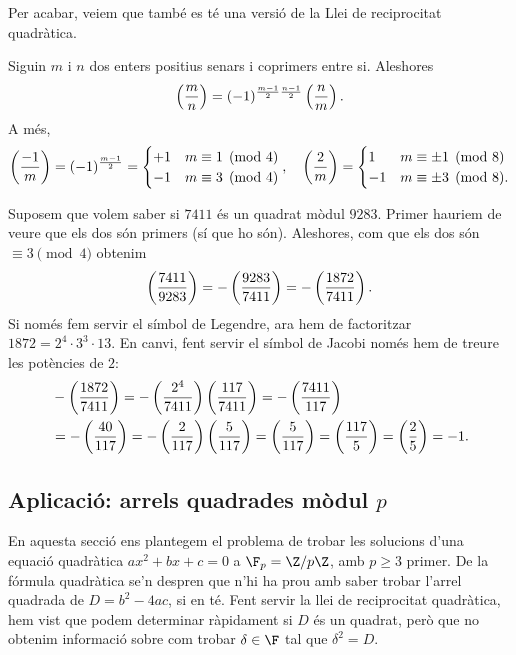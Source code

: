 Per acabar, veiem que també es té una versió de la Llei de reciprocitat quadràtica.

 \begin{theorem}
\label{thm:lrq-jacobi}
Siguin $m$ i $n$ dos enters positius senars i coprimers entre si. Aleshores
\[
    \left(\frac{m}{n}\right) = (-1)^{\frac{m-1}{2}\frac{n-1}{2}}\left(\frac{n}{m}\right).
    \]
A més,
\[
\left(\frac{-1}{m}\right) = (-1)^{\frac{m-1}{2}}=\begin{cases}
+1&m\equiv 1\pmod{4}\\
-1&m\equiv 3\pmod{4}
\end{cases}
,\quad \left(\frac{2}{m}\right) = \begin{cases}
1 & m\equiv \pm 1\pmod {8}\\
-1 & m \equiv \pm 3 \pmod{8}.
\end{cases}
\]
\end{theorem}

\begin{example}
 Suposem que volem saber si $7411$ és un quadrat mòdul $9283$. Primer hauriem de veure que els dos són primers (sí que ho són). Aleshores, com que els dos són $\equiv 3\pmod 4$ obtenim
 \[
 \left(\frac{7411}{9283}\right) = -\left(\frac{9283}{7411}\right)=-\left(\frac{1872}{7411}\right).
 \]
 Si només fem servir el símbol de Legendre, ara hem de factoritzar $1872=2^4\cdot 3^3\cdot 13$. En canvi, fent servir el símbol de Jacobi només hem de treure les potències de $2$:
 \begin{align*}
 &-\left(\frac{1872}{7411}\right) =-\left(\frac{2^4}{7411}\right)\left(\frac{117}{7411}\right) = -\left(\frac{7411}{117}\right)\\
 &=-\left(\frac{40}{117}\right) = -\left(\frac{2}{117}\right)\left(\frac{5}{117}\right) = \left(\frac{5}{117}\right)=\left(\frac{117}{5}\right) = \left(\frac{2}{5}\right)=-1.
 \end{align*}
\end{example}
 \subsection{Aplicació: arrels quadrades mòdul \texorpdfstring{$p$}{p}}
 \label{sec:arrels-quadrades}
 
 En aquesta secció ens plantegem el problema de trobar les solucions d'una equació quadràtica $ax^2+bx+c=0$ a $\F_p=\Z/p\Z$, amb $p\geq 3$ primer. De la fórmula quadràtica se'n despren que n'hi ha prou amb saber trobar l'arrel quadrada de $D=b^2-4ac$, si en té. Fent servir la llei de reciprocitat quadràtica, hem vist que podem determinar ràpidament si $D$ és un quadrat, però que no obtenim informació sobre com trobar $\delta\in \F$ tal que $\delta^2=D$.
 
